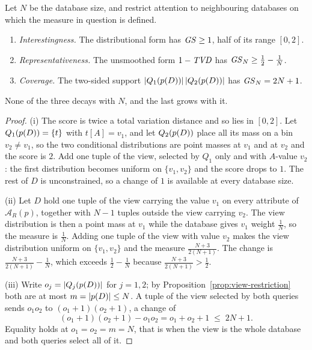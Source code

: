 \begin{proposition}
\label{prop:sensitivity-itemized}
Let $N$ be the database size, and restrict attention to neighbouring databases on which the measure in question is defined.
\begin{enumerate}[label=(\roman*),leftmargin=*]
\item \emph{Interestingness.} The distributional form has $\mathit{GS}\ge1$, half of its range $[0,2]$.
\item \emph{Representativeness.} The unsmoothed form $1-\mathit{TVD}$ has $\mathit{GS}_N\ge\frac12-\frac1N$.
\item \emph{Coverage.} The two-sided support $|Q_1(p(D))|\,|Q_2(p(D))|$ has $\mathit{GS}_N=2N+1$.
\end{enumerate}
None of the three decays with $N$, and the last grows with it.
\end{proposition}

\begin{proof}
(i) The score is twice a total variation distance and so lies in $[0,2]$.
Let $Q_1(p(D))=\{t\}$ with $t[A]=v_1$, and let $Q_2(p(D))$ place all its mass on a bin $v_2\ne v_1$, so the two conditional distributions are point masses at $v_1$ and at $v_2$ and the score is $2$.
Add one tuple of the view, selected by $Q_1$ only and with $A$-value $v_2$: the first distribution becomes uniform on $\{v_1,v_2\}$ and the score drops to $1$.
The rest of $D$ is unconstrained, so a change of $1$ is available at every database size.

(ii) Let $D$ hold one tuple of the view carrying the value $v_1$ on every attribute of $\mathcal{A}_R(p)$, together with $N-1$ tuples outside the view carrying $v_2$.
The view distribution is then a point mass at $v_1$ while the database gives $v_1$ weight $\tfrac1N$, so the measure is $\tfrac1N$.
Adding one tuple of the view with value $v_2$ makes the view distribution uniform on $\{v_1,v_2\}$ and the measure $\tfrac{N+3}{2(N+1)}$.
The change is $\tfrac{N+3}{2(N+1)}-\tfrac1N$, which exceeds $\tfrac12-\tfrac1N$ because $\tfrac{N+3}{2(N+1)}>\tfrac12$.

(iii) Write $o_j=|Q_j(p(D))|$ for $j=1,2$; by Proposition~\ref{prop:view-restriction} both are at most $m=|p(D)|\le N$.
A tuple of the view selected by both queries sends $o_1o_2$ to $(o_1+1)(o_2+1)$, a change of
\[
(o_1+1)(o_2+1)-o_1o_2=o_1+o_2+1\;\le\;2N+1 .
\]
Equality holds at $o_1=o_2=m=N$, that is when the view is the whole database and both queries select all of it.
\end{proof}

